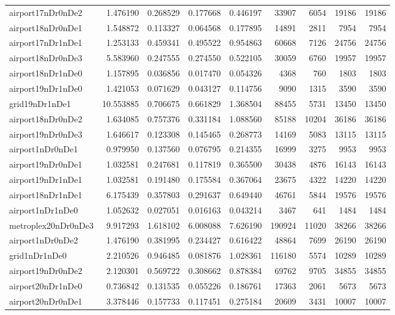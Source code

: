 \begin{longtable}{|l|r|r|r|r|r|r|r|r|}
airport17nDr0nDe2 & 1.476190 & 0.268529 & 0.177668 & 0.446197 & 33907 & 6054 & 19186 & 19186 \\
airport18nDr0nDe1 & 1.548872 & 0.113327 & 0.064568 & 0.177895 & 14891 & 2811 & 7954 & 7954 \\
airport17nDr1nDe1 & 1.253133 & 0.459341 & 0.495522 & 0.954863 & 60668 & 7126 & 24756 & 24756 \\
airport18nDr0nDe3 & 5.583960 & 0.247555 & 0.274550 & 0.522105 & 30059 & 6760 & 19957 & 19957 \\
airport18nDr1nDe0 & 1.157895 & 0.036856 & 0.017470 & 0.054326 & 4368 & 760 & 1803 & 1803 \\
airport19nDr1nDe0 & 1.421053 & 0.071629 & 0.043127 & 0.114756 & 9090 & 1315 & 3590 & 3590 \\
grid19nDr1nDe1 & 10.553885 & 0.706675 & 0.661829 & 1.368504 & 88455 & 5731 & 13450 & 13450 \\
airport18nDr0nDe2 & 1.634085 & 0.757376 & 0.331184 & 1.088560 & 85188 & 10204 & 36186 & 36186 \\
airport19nDr0nDe3 & 1.646617 & 0.123308 & 0.145465 & 0.268773 & 14169 & 5083 & 13115 & 13115 \\
airport1nDr0nDe1 & 0.979950 & 0.137560 & 0.076795 & 0.214355 & 16999 & 3275 & 9953 & 9953 \\
airport19nDr0nDe1 & 1.032581 & 0.247681 & 0.117819 & 0.365500 & 30438 & 4876 & 16143 & 16143 \\
airport19nDr1nDe1 & 1.032581 & 0.191480 & 0.175584 & 0.367064 & 23675 & 4322 & 14220 & 14220 \\
airport18nDr1nDe1 & 6.175439 & 0.357803 & 0.291637 & 0.649440 & 46761 & 5844 & 19576 & 19576 \\
airport1nDr1nDe0 & 1.052632 & 0.027051 & 0.016163 & 0.043214 & 3467 & 641 & 1484 & 1484 \\
metroplex20nDr0nDe3 & 9.917293 & 1.618102 & 6.008088 & 7.626190 & 190924 & 11020 & 38266 & 38266 \\
airport1nDr0nDe2 & 1.476190 & 0.381995 & 0.234427 & 0.616422 & 48864 & 7699 & 26190 & 26190 \\
grid1nDr1nDe0 & 2.210526 & 0.946485 & 0.081876 & 1.028361 & 116180 & 5574 & 10289 & 10289 \\
airport19nDr0nDe2 & 2.120301 & 0.569722 & 0.308662 & 0.878384 & 69762 & 9705 & 34855 & 34855 \\
airport20nDr1nDe0 & 0.736842 & 0.131535 & 0.055226 & 0.186761 & 17363 & 2061 & 5673 & 5673 \\
airport20nDr0nDe1 & 3.378446 & 0.157733 & 0.117451 & 0.275184 & 20609 & 3431 & 10007 & 10007 \\

\end{longtable}
